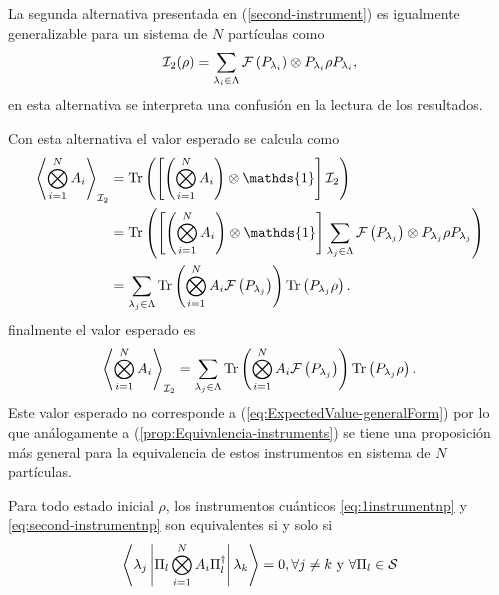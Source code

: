 La segunda alternativa presentada en ({\ref{second-instrument}}) es igualmente generalizable para un sistema de $N$ partículas como \begin{equation}\label{eq:second-instrumentnp}
    \mathcal{I}_2(\rho)= \sum_{\lambda_i \in \Lambda } \mathcal{F}\left(P_{\lambda_i}\right)\otimes P_{\lambda_i}\rho P_{\lambda_i},
\end{equation}  en esta alternativa se interpreta una confusión en la lectura de los resultados.




Con esta alternativa el valor esperado se calcula como 
\begin{equation*}
    \begin{split}
        \left \la \prodtensor A_i \right \ra_{\mathcal{I}_2}&=\tr\left( \left[\left(\prodtensor A_i\right) \otimes \mathds{1}\right]\mathcal{I}_2\right) \\
        &=\tr\left(\left[ \left(\prodtensor A_i\right)\otimes \mathds{1}\right]\sum_{\lambda_j \in \Lambda}\fuzzy{P_{\lambda_j}}\otimes P_{\lambda_j}{\rho}P_{\lambda_j} \right)\\
        &=\sum_{\lambda_j\in \Lambda} \tr\left(\prodtensor A_i\fuzzy{P_{\lambda_j}}\right) \tr\left(P_{\lambda_j}\rho\right). \\
    \end{split}
\end{equation*} finalmente el valor esperado es \begin{equation}\label{eq:valor-esperado-2instrumentnp}
    \left \langle \bigotimes_{i=1}^{N} A_i \right \rangle_{\mathcal{I}_2}=\sum_{\lambda_j\in \Lambda} {\rm Tr}\left(\bigotimes_{i=1}^{N} A_i\mathcal{F}\left(P_{\lambda_j}\right)\right) {\rm Tr}\left(P_{\lambda_j}\rho\right).
\end{equation} Este valor esperado no corresponde a (\ref{eq:ExpectedValue-generalForm}) por lo que análogamente a (\ref{prop:Equivalencia-instruments}) se tiene una proposición más general para la equivalencia de estos instrumentos en sistema de $N$ partículas.

\begin{proposition}\label{prop:Equivalencia-instrumentos-np}
    Para todo estado inicial $\rho$, los instrumentos cuánticos {\ref{eq:1instrumentnp}} y {\ref{eq:second-instrumentnp}} son equivalentes si y solo si \[\left \langle \lambda_j \left|{\Pi_{l}\bigotimes_{i=1}^{N} A_i\Pi_{l}^{\dagger}}\right|\lambda_k\right\rangle=0,\forall j\ne k \text{ y } \forall \Pi_l \in \mathcal{S}\]
\end{proposition}

